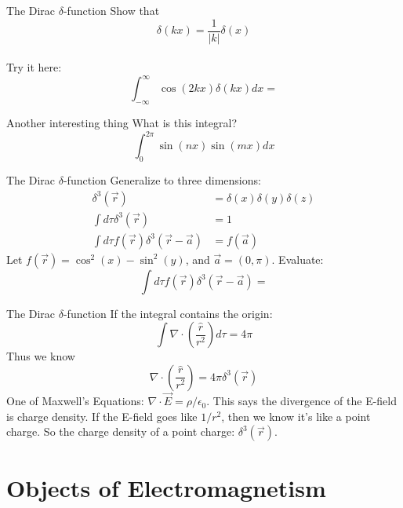 \documentclass{beamer}
\begin{document}
\begin{frame}{The Dirac $\delta$-function}
Show that
\begin{equation}
\delta(kx) = \frac{1}{|k|}\delta(x)
\end{equation} \\ \vspace{2cm}
Try it here:
\begin{equation}
\int_{-\infty}^{\infty} \cos(2kx) \delta(kx) dx = 
\end{equation}
\end{frame}

\begin{frame}{Another interesting thing}
What is this integral?
\begin{equation}
\int_0^{2\pi} \sin(nx)\sin(mx) dx
\end{equation}
\end{frame}

\begin{frame}{The Dirac $\delta$-function}
Generalize to three dimensions:
\begin{align}
\delta^3(\vec{r}) &= \delta(x) \delta(y) \delta(z) \\
\int d\tau \delta^3(\vec{r}) &= 1 \\
\int d\tau f(\vec{r})\delta^3(\vec{r}-\vec{a}) &= f(\vec{a})
\end{align}
Let $f(\vec{r}) = \cos^2(x) - \sin^2(y)$, and $\vec{a} = (0,\pi)$.  Evaluate:
\begin{equation}
\int d\tau f(\vec{r})\delta^3(\vec{r}-\vec{a}) = 
\end{equation}
\end{frame}

\begin{frame}{The Dirac $\delta$-function}
If the integral contains the origin:
\begin{equation}
\int \nabla \cdot \left(\frac{\hat{r}}{r^2}\right) d\tau = 4\pi
\end{equation}
Thus we know
\begin{equation}
\nabla \cdot \left(\frac{\hat{r}}{r^2}\right) =  4\pi \delta^3(\vec{r})
\end{equation}
One of Maxwell's Equations: $\nabla \cdot \vec{E} = \rho/\epsilon_0$.  This says the divergence of the E-field is charge density.  If the E-field goes like $1/r^2$, then we know it's like a point charge.  So the charge density of a point charge: $\delta^3(\vec{r})$.
\end{frame}

\section{Objects of Electromagnetism}
\end{document}
